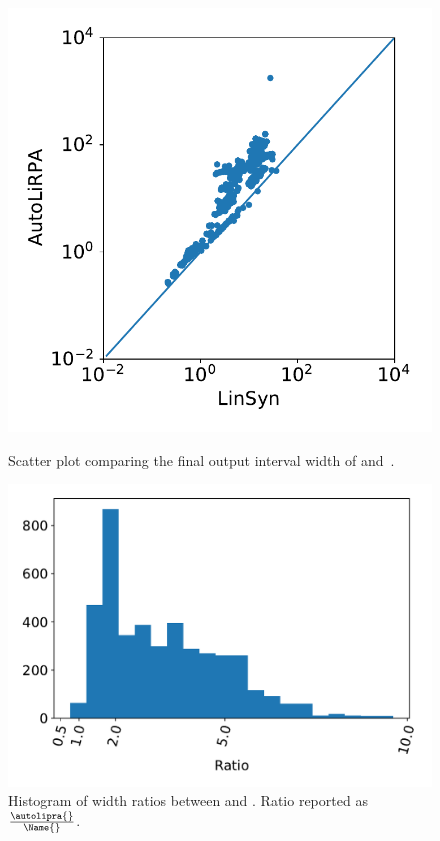 \begin{figure}[t]
	\centering
	\begin{minipage}{.42\textwidth}
		\centering
		\includegraphics[width=\linewidth]{onlinesyn/figs/width_scatter.pdf}
		\caption{Scatter plot comparing the final output interval width of
		\Name{} and~\autolipra{}.}
		\label{onlinesyn:fig:scatter-plot}
	\end{minipage}\hspace{24pt}%
	\begin{minipage}{.5\textwidth}
		\centering
		\includegraphics[width=\linewidth]{onlinesyn/figs/ratio_hist.pdf}

		\caption{Histogram of width ratios between \autolipra{} and \Name{}. Ratio reported as $
		\frac{\autolipra{}}{\Name{}} $.}
		\label{onlinesyn:fig:ratio-hist}
	\end{minipage}
\end{figure}

